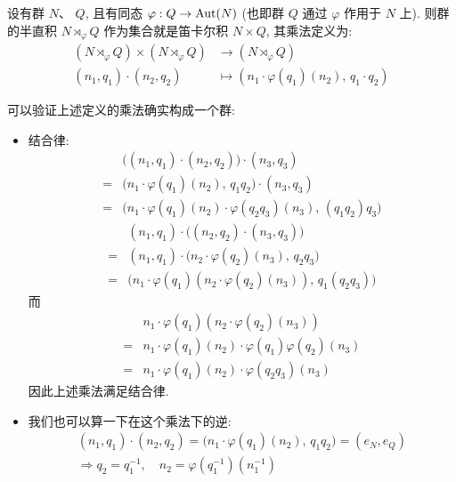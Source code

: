     \begin{definition}[群的半直积]
        设有群 $N$、 $Q$, 且有同态 $\varphi:Q\rightarrow{\rm Aut}(N)$ (也即群 $Q$ 通过 $\varphi$ 作用于 $N$ 上).
        则群的半直积 $N\rtimes_{\varphi} Q$ 作为集合就是笛卡尔积 $N\times Q$, 其乘法定义为:
        \begin{align*}
            (N\rtimes_{\varphi}Q)\times(N\rtimes_{\varphi}Q)&\rightarrow(N\rtimes_{\varphi}Q) \\
            (n_1,q_1)\cdot(n_2,q_2)&\mapsto(n_1\cdot\varphi(q_1)(n_2),\,q_1\cdot q_2)
        \end{align*}
    \end{definition}
    \begin{remark}
        可以验证上述定义的乘法确实构成一个群:
        \begin{itemize}
            \item 结合律:
            \begin{align*}
                &\Big((n_1,q_1)\cdot(n_2,q_2)\Big)\cdot(n_3,q_3) \\
                =&\Big(n_1\cdot\varphi(q_1)(n_2),\,q_1q_2\Big)\cdot(n_3,q_3) \\
                =&\Big(n_1\cdot\varphi(q_1)(n_2)\cdot\varphi(q_2q_3)(n_3),\,(q_1q_2)q_3\Big) 
            \end{align*}
            \begin{align*}
                &(n_1,q_1)\cdot\Big((n_2,q_2)\cdot(n_3,q_3)\Big) \\
                =&(n_1,q_1)\cdot\Big(n_2\cdot\varphi(q_2)(n_3),\,q_2q_3\Big) \\
                =&\Big(n_1\cdot\varphi(q_1)(n_2\cdot\varphi(q_2)(n_3)),\,q_1(q_2q_3)\Big)
            \end{align*}
            而
            \begin{align*}
                &n_1\cdot\varphi(q_1)(n_2\cdot\varphi(q_2)(n_3)) \\
                =&n_1\cdot\varphi(q_1)(n_2)\cdot\varphi(q_1)\varphi(q_2)(n_3) \\
                =&n_1\cdot\varphi(q_1)(n_2)\cdot\varphi(q_2q_3)(n_3)
            \end{align*}
            因此上述乘法满足结合律.
            \item 我们也可以算一下在这个乘法下的逆:
            \begin{gather*}
                (n_1,q_1)\cdot(n_2,q_2) = \Big(n_1\cdot\varphi(q_1)(n_2),\,q_1q_2\Big) = (e_N,e_Q) \\
                \Rightarrow q_2 = q_1^{-1},\quad n_2 = \varphi(q_1^{-1})(n_1^{-1})
            \end{gather*}
        \end{itemize}


\end{remark}
